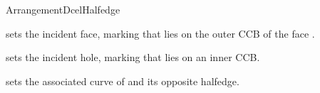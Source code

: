 \begin{ccRefConcept}{ArrangementDcelHalfedge}
{
    {sets the incident face, marking that \ccVar{} lies on the outer CCB
     of the face .}

    {sets the incident hole, marking that \ccVar{} lies on an inner CCB.}

    {sets the associated curve of \ccVar{} and its opposite halfedge.}

} %

\ccSeeAlso

     \\
     \\
     \\
     \\

\end{ccRefConcept}  

\ccRefPageEnd
